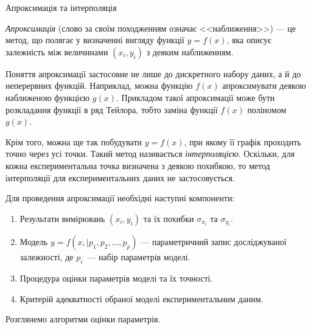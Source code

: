 \documentclass{LabBook}
\begin{document}
  \begin{More}{Апроксимація та інтерполяція}

    \emph{Апроксимація} (слово за своїм походженням означає <<наближення>>) --- це метод, що полягає у визначенні вигляду функції $y = f(x)$, яка описує залежність між величинами  $(x_i, y_i)$ з деяким наближенням.

    Поняття апроксимації застосовне не лише до дискретного набору даних, а й до неперервних функцій. Наприклад, можна функцію $f(x)$ апроксимувати деякою наближеною функцією $g(x)$. Прикладом такої апроксимації може бути розкладання функції в ряд Тейлора, тобто заміна функції  $f(x)$ поліномом $g(x)$.

    Крім того, можна ще так побудувати $y = f(x)$, при якому її графік проходить точно через усі точки. Такий метод називається \emph{інтерполяцією}. Оскільки, для кожна експериментальна точка визначена з деякою похибкою, то метод інтерполяції для експериментальних даних не застосовується.
  \end{More}





  Для проведення апроксимації необхідні наступні компоненти:
  \begin{enumerate}
    \item Результати вимірювань $(x_i, y_i)$ та їх похибки $\sigma_{x_i}$ та $\sigma_{y_i}$.
    \item Модель $y = f(x, | p_1, p_2, \ldots, p_p)$ --- параметричний запис досліджуваної залежності, де $p_i$~--- набір параметрів моделі.
    \item Процедура оцінки параметрів моделі та їх точності.
    \item Критерій адекватності обраної моделі експериментальним даним.
  \end{enumerate}
  Розглянемо алгоритми оцінки параметрів.
\end{document}
